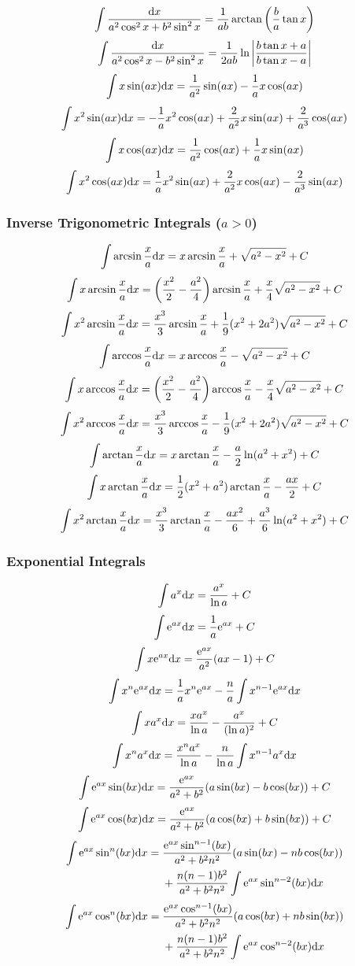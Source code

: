 \[ 
\int \frac{\mathrm{d} x}{a^2\cos^2x+b^2\sin^2x} = \frac{1}{ab} \arctan\left( \frac{b}{a}\tan x \right) 
\]
\[ 
\int \frac{\mathrm{d} x}{a^2\cos^2x-b^2\sin^2x} = \frac{1}{2ab}\ln\left|\frac{b\tan x+a}{b\tan x-a}\right| 
\]
\[ 
\int x \sin (ax) \mathrm{d} x = \frac{1}{a^2} \sin (ax) - \frac{1}{a} x \cos (ax) 
\]
\[ 
\int x^2 \sin (ax) \mathrm{d} x = -\frac{1}{a} x^2 \cos (ax) + \frac{2}{a^2} x \sin (ax) + \frac{2}{a^3} \cos (ax) 
\]
\[ 
\int x \cos (ax) \mathrm{d} x = \frac{1}{a^2} \cos (ax) + \frac{1}{a} x \sin (ax) 
\]
\[ 
\int x^2 \cos (ax) \mathrm{d} x = \frac{1}{a} x^2 \sin (ax) + \frac{2}{a^2} x \cos (ax) - \frac{2}{a^3} \sin (ax) 
\]

\subsubsection*{Inverse Trigonometric Integrals ($a>0$)}
\[ 
\int \arcsin \frac{x}{a} \mathrm{d} x = x \arcsin \frac{x}{a} + \sqrt{a^2-x^2}+C 
\]
\[ 
\int x \arcsin \frac{x}{a} \mathrm{d} x= \left(\frac{x^2}{2}-\frac{a^2}{4}\right)\arcsin \frac{x}{a} + \frac{x}{4} \sqrt{a^2-x^2}+C
\]
\[ 
\int x^2 \arcsin \frac{x}{a} \mathrm{d} x = \frac{x^3}{3}\arcsin \frac{x}{a}+\frac{1}{9}(x^2+2 a^2)\sqrt{a^2-x^2}+C 
\]
\[ 
\int \arccos \frac{x}{a} \mathrm{d} x= x \arccos \frac{x}{a} - \sqrt{a^2-x^2} +C 
\]
\[ 
\int x \arccos \frac{x}{a} \mathrm{d} x= \left(\frac{x^2}{2}-\frac{a^2}{4}\right)\arccos \frac{x}{a} - \frac{x}{4} \sqrt{a^2-x^2}+C 
\]
\[ 
\int x^2 \arccos \frac{x}{a}\mathrm{d} x= \frac{x^3}{3}\arccos \frac{x}{a} - \frac{1}{9}(x^2+2a^2)\sqrt{a^2-x^2}+C
\]
\[ 
\int \arctan \frac{x}{a} \mathrm{d} x=x \arctan \frac{x}{a}-\frac{a}{2}\ln (a^2+x^2)+C 
\]
\[ 
\int x\arctan \frac{x}{a} \mathrm{d} x = \frac{1}{2}(x^2+a^2)\arctan \frac{x}{a} -\frac{ax}{2}+C 
\]
\[ 
\int x^2 \arctan \frac{x}{a} \mathrm{d} x= \frac{x^3}{3} \arctan \frac{x}{a} - \frac{ax^2}{6} + \frac{a^3}{6} \ln (a^2+x^2)+C 
\]

\subsubsection*{Exponential Integrals}
\[ 
\int a^x \mathrm{d} x= \frac{a^x}{\ln a} + C
\]
\[ 
\int \mathrm{e}^{ax}\mathrm{d} x=\frac{1}{a}\mathrm{e}^{ax}+C 
\] 
\[ 
\int x \mathrm{e}^{ax} \mathrm{d} x=\frac{\mathrm{e}^{ax}}{a^2}(ax-1) +C 
\]
\[ 
\int x^n \mathrm{e}^{ax} \mathrm{d} x=\frac{1}{a}x^n \mathrm{e}^{ax}-\frac{n}{a} \int x^{n-1} \mathrm{e}^{ax} \mathrm{d} x 
\]
\[ 
\int x a^x \mathrm{d} x = \frac{xa^x}{\ln a}-\frac{a^x}{(\ln a)^2}+C 
\]
\[ 
\int x^n a^x \mathrm{d} x= \frac{x^n a^x}{\ln a}-\frac{n}{\ln a}\int x^{n-1}a^x \mathrm{d} x 
\]
\[ 
\int \mathrm{e}^{ax} \sin(bx) \mathrm{d} x = \frac{\mathrm{e}^{ax}}{a^2+b^2}(a \sin(bx) - b \cos(bx))+C 
\]
\[ 
\int \mathrm{e}^{ax} \cos(bx) \mathrm{d} x = \frac{\mathrm{e}^{ax}}{a^2+b^2}(a \cos(bx) + b \sin(bx))+C 
\]
\[ 
\begin{split}
\int \mathrm{e}^{ax} \sin^n (bx) \mathrm{d} x = {}& \frac{\mathrm{e}^{ax} \sin^{n-1}(bx)}{a^2+b^2 n^2} (a \sin(bx) - nb \cos(bx)) \\
& +\frac{n(n-1)b^2}{a^2+b^2 n^2}\int \mathrm{e}^{ax} \sin^{n-2}(bx) \mathrm{d} x 
\end{split}
\]
\[ 
\begin{split}
\int \mathrm{e}^{ax} \cos^n (bx) \mathrm{d} x = {}& \frac{\mathrm{e}^{ax} \cos^{n-1}(bx)}{a^2+b^2 n^2} (a \cos(bx) + nb \sin(bx)) \\
& +\frac{n(n-1)b^2}{a^2+b^2 n^2}\int \mathrm{e}^{ax} \cos^{n-2}(bx) \mathrm{d} x 
\end{split}
\]

